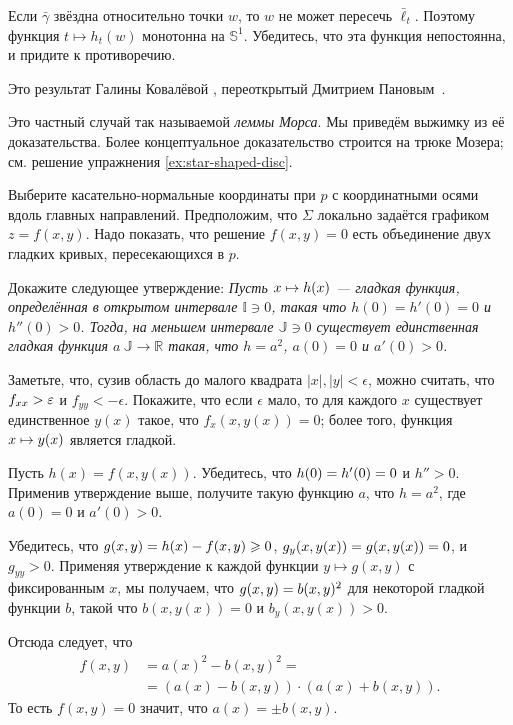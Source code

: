 \begin{multicols}{2}
Если $\bar\gamma$ звёздна относительно точки $w$, то $w$ не может пересечь $\bar\ell_t$.
Поэтому функция $t\mapsto h_t(w)$ монотонна на $\mathbb{S}^1$.
Убедитесь, что эта функция непостоянна, и придите к противоречию.

Это результат Галины Ковалёвой \cite{kovaleva}, переоткрытый Дмитрием Пановым~\cite{panov-curves}.

Это частный случай так называемой \emph{леммы Морса}.
Мы приведём выжимку из её доказательства.
Более концептуальное доказательство \cite{abraham-marsden-ratiu} строится на трюке Мозера; см. решение упражнения \ref{ex:star-shaped-disc}.

\medskip

Выберите касательно-нормальные координаты при $p$ с координатными осями вдоль главных направлений.
Предположим, что $\Sigma$ локально задаётся графиком $z=f(x,y)$.
Надо показать, что решение $f(x,y)=0$ есть объединение двух гладких кривых, пересекающихся в $p$.

Докажите следующее утверждение:
\textit{Пусть $x\z\mapsto h(x)$ --- гладкая функция, определённая в открытом интервале $\mathbb{I}\ni0$, такая что $h(0)=h'(0)=0$ и $h''(0)>0$.
Тогда, на меньшем интервале $\mathbb{J}\ni0$ существует единственная гладкая функция $a\:\mathbb{J}\to\mathbb{R}$ такая, что $h=a^2$, $a(0)=0$ и $a'(0)> 0$.}

Заметьте, что, сузив область до малого квадрата  $|x|,|y|<\epsilon$, можно считать, что $f_{xx}\z>\epsilon$ и $f_{yy}<-\epsilon$.
Покажите, что если $\epsilon$ мало, то для каждого $x$ существует единственное $y(x)$ такое, что $f_x(x,y(x))=0$; более того, функция $x\z\mapsto y(x)$ является гладкой.

Пусть $h(x)=f(x,y(x))$.
Убедитесь, что $h(0)\z=h'(0)=0$ и $h''>0$.
Применив утверждение выше, получите такую функцию $a$, что $h=a^2$, где $a(0)=0$ и $a'(0)>0$.

Убедитесь, что $g(x,y)=h(x)-f(x,y)\z\ge 0$, $g_y(x,y(x))\z=g(x,y(x))\z=0$, и $g_{yy}>0$.
Применяя утверждение к каждой функции $y\mapsto g(x,y)$ с фиксированным $x$, мы получаем, что $g(x,y)\z=b(x,y)^2$ для некоторой гладкой функции $b$, такой что
$b(x,y(x))=0$ и $b_y(x,y(x))>0$.

Отсюда следует, что 
\begin{align*}
f(x,y)&=a(x)^2-b(x,y)^2=
\\
&=
(a(x)-b(x,y))\cdot (a(x)+b(x,y)).
\end{align*}
То есть $f(x,y)=0$ значит, что $a(x)=\pm b(x,y)$.


\end{multicols}
